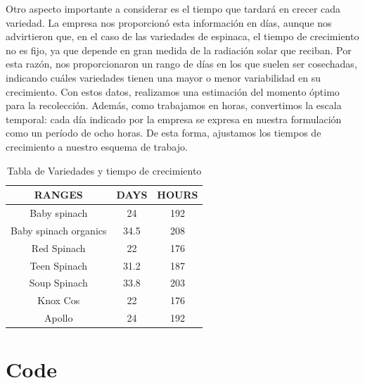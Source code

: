 Otro aspecto importante a considerar es el tiempo que tardará en crecer cada variedad. La empresa nos proporcionó esta 
información en días, aunque nos advirtieron que, en el caso de las variedades de espinaca, el tiempo de crecimiento no es fijo,
 ya que depende en gran medida de la radiación solar que reciban. Por esta razón, nos proporcionaron un rango de días en los que 
 suelen ser cosechadas, indicando cuáles variedades tienen una mayor o menor variabilidad en su crecimiento. Con estos datos, 
 realizamos una estimación del momento óptimo para la recolección. Además, como trabajamos en horas, convertimos la escala temporal:
 cada día indicado por la empresa se expresa en nuestra formulación como un período de ocho horas. De esta forma, ajustamos los tiempos 
 de crecimiento a nuestro esquema de trabajo.
\begin{table}[ht!]
    \centering
    \begin{minipage}{0.48\textwidth}
        \centering
        \begin{tabular}{|c|c|c|}
            \hline
            \rowcolor{gray!30} \textbf{\textcolor{grey3}{RANGES}} & \textbf{\textcolor{grey3}{DAYS}} &  \textbf{\textcolor{grey3}{HOURS}}\\ 
            \hline
            Baby spinach   & 24 & 192 \\ \hline
            Baby spinach organics  & 34.5 & 208\\ \hline
            Red Spinach              & 22 & 176\\ \hline
            Teen Spinach           & 31.2 & 187\\ \hline
            Soup Spinach & 33.8 & 203 \\ \hline
            Knox Cos     & 22 & 176 \\ \hline
            Apollo      & 24 & 192 \\ \hline
             
            \hline
        \end{tabular}
        \caption{Tabla de Variedades y tiempo de crecimiento}
        \label{tab:Variedades}
    \end{minipage}
    \hfill
\end{table}
\chapter*{Code}

